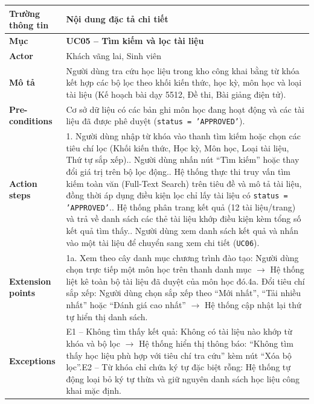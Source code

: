 \begin{table}[H]
\centering
\footnotesize\linespread{1.05}\selectfont
\setlength{\tabcolsep}{5pt}
\renewcommand{\arraystretch}{1.12}
\begin{tabularx}{\textwidth}{|p{3.5cm}|X|}
\hline
\rowcolor[HTML]{EAEAEA}
\textbf{Trường thông tin} & \textbf{Nội dung đặc tả chi tiết} \\
\hline
\textbf{Mục} & \textbf{UC05 -- Tìm kiếm và lọc tài liệu} \\
\hline
\textbf{Actor} & Khách vãng lai, Sinh viên \\
\hline
\textbf{Mô tả} & Người dùng tra cứu học liệu trong kho công khai bằng từ khóa kết hợp các bộ lọc theo khối kiến thức, học kỳ, môn học và loại tài liệu (Kế hoạch bài dạy 5512, Đề thi, Bài giảng điện tử). \\
\hline
\textbf{Pre-conditions} & Cơ sở dữ liệu có các bản ghi môn học đang hoạt động và các tài liệu đã được phê duyệt (\texttt{status = 'APPROVED'}). \\
\hline
\textbf{Action steps} & 1. Người dùng nhập từ khóa vào thanh tìm kiếm hoặc chọn các tiêu chí lọc (Khối kiến thức, Học kỳ, Môn học, Loại tài liệu, Thứ tự sắp xếp).\newline 2. Người dùng nhấn nút ``Tìm kiếm'' hoặc thay đổi giá trị trên bộ lọc động.\newline 3. Hệ thống thực thi truy vấn tìm kiếm toàn văn (Full-Text Search) trên tiêu đề và mô tả tài liệu, đồng thời áp dụng điều kiện lọc chỉ lấy tài liệu có \texttt{status = 'APPROVED'}.\newline 4. Hệ thống phân trang kết quả (12 tài liệu/trang) và trả về danh sách các thẻ tài liệu khớp điều kiện kèm tổng số kết quả tìm thấy.\newline 5. Người dùng xem danh sách kết quả và nhấn vào một tài liệu để chuyển sang xem chi tiết (\texttt{UC06}). \\
\hline
\textbf{Extension points} & 1a. Xem theo cây danh mục chương trình đào tạo: Người dùng chọn trực tiếp một môn học trên thanh danh mục $\rightarrow$ Hệ thống liệt kê toàn bộ tài liệu đã duyệt của môn học đó.\newline 4a. Đổi tiêu chí sắp xếp: Người dùng chọn sắp xếp theo ``Mới nhất'', ``Tải nhiều nhất'' hoặc ``Đánh giá cao nhất'' $\rightarrow$ Hệ thống cập nhật lại thứ tự hiển thị danh sách. \\
\hline
\textbf{Exceptions} & E1 -- Không tìm thấy kết quả: Không có tài liệu nào khớp từ khóa và bộ lọc $\rightarrow$ Hệ thống hiển thị thông báo: ``Không tìm thấy học liệu phù hợp với tiêu chí tra cứu'' kèm nút ``Xóa bộ lọc''.\newline E2 -- Từ khóa chỉ chứa ký tự đặc biệt rỗng: Hệ thống tự động loại bỏ ký tự thừa và giữ nguyên danh sách học liệu công khai mặc định. \\

\end{tabularx}
\end{table}
